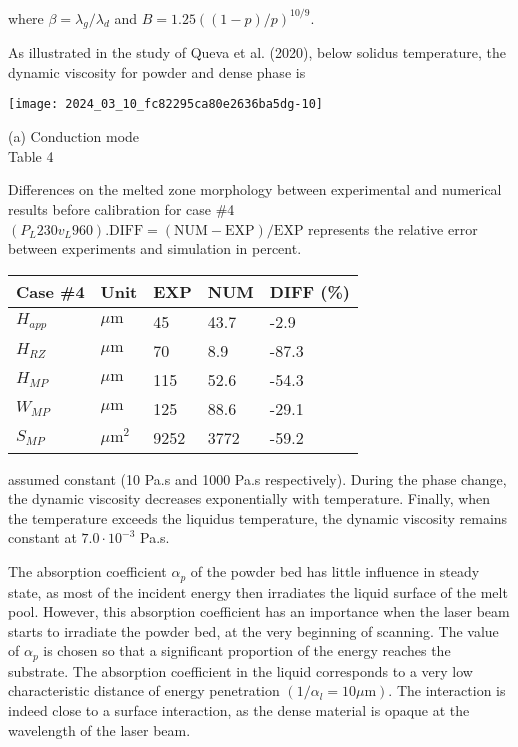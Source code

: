\documentclass[10pt]{article}
\begin{document}
where $\beta=\lambda_{g} / \lambda_{d}$ and $B=1.25((1-p) / p)^{10 / 9}$.

As illustrated in the study of Queva et al. (2020), below solidus temperature, the dynamic viscosity for powder and dense phase is

\begin{center}
\texttt{[image: 2024\_03\_10\_fc82295ca80e2636ba5dg-10]}
\end{center}

(a) Conduction mode\\
Table 4

Differences on the melted zone morphology between experimental and numerical results before calibration for case \#4 $\left(P_{L} 230 v_{L} 960\right) . \mathrm{DIFF}=(\mathrm{NUM}-\mathrm{EXP}) / \mathrm{EXP}$ represents the relative error between experiments and simulation in percent.

\begin{center}
\begin{tabular}{lllll}
\hline
Case \#4 & Unit & EXP & NUM & DIFF (\%) \\
\hline
$H_{a p p}$ & $\mu \mathrm{m}$ & 45 & 43.7 & -2.9 \\
$H_{R Z}$ & $\mu \mathrm{m}$ & 70 & 8.9 & -87.3 \\
$H_{M P}$ & $\mu \mathrm{m}$ & 115 & 52.6 & -54.3 \\
$W_{M P}$ & $\mu \mathrm{m}$ & 125 & 88.6 & -29.1 \\
$S_{M P}$ & $\mu \mathrm{m}^{2}$ & 9252 & 3772 & -59.2 \\
\hline
\end{tabular}
\end{center}

assumed constant (10 Pa.s and 1000 Pa.s respectively). During the phase change, the dynamic viscosity decreases exponentially with temperature. Finally, when the temperature exceeds the liquidus temperature, the dynamic viscosity remains constant at $7.0 \cdot 10^{-3}$ Pa.s.

The absorption coefficient $\alpha_{p}$ of the powder bed has little influence in steady state, as most of the incident energy then irradiates the liquid surface of the melt pool. However, this absorption coefficient has an importance when the laser beam starts to irradiate the powder bed, at the very beginning of scanning. The value of $\alpha_{p}$ is chosen so that a significant proportion of the energy reaches the substrate. The absorption coefficient in the liquid corresponds to a very low characteristic distance of energy penetration $\left(1 / \alpha_{l}=10 \mu \mathrm{m}\right)$. The interaction is indeed close to a surface interaction, as the dense material is opaque at the wavelength of the laser beam.
\end{document}
